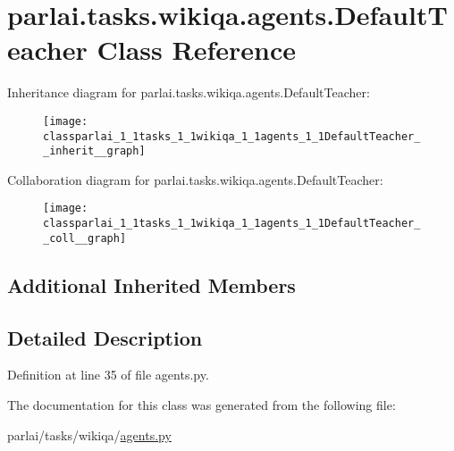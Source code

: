 \hypertarget{classparlai_1_1tasks_1_1wikiqa_1_1agents_1_1DefaultTeacher}{}\section{parlai.\+tasks.\+wikiqa.\+agents.\+Default\+Teacher Class Reference}
\label{classparlai_1_1tasks_1_1wikiqa_1_1agents_1_1DefaultTeacher}


Inheritance diagram for parlai.\+tasks.\+wikiqa.\+agents.\+Default\+Teacher\+:
\nopagebreak
\begin{figure}[H]
\begin{center}
\leavevmode
\texttt{[image: classparlai\_1\_1tasks\_1\_1wikiqa\_1\_1agents\_1\_1DefaultTeacher\_\_inherit\_\_graph]}
\end{center}
\end{figure}


Collaboration diagram for parlai.\+tasks.\+wikiqa.\+agents.\+Default\+Teacher\+:
\nopagebreak
\begin{figure}[H]
\begin{center}
\leavevmode
\texttt{[image: classparlai\_1\_1tasks\_1\_1wikiqa\_1\_1agents\_1\_1DefaultTeacher\_\_coll\_\_graph]}
\end{center}
\end{figure}
\subsection*{Additional Inherited Members}


\subsection{Detailed Description}


Definition at line 35 of file agents.\+py.



The documentation for this class was generated from the following file\+:\begin{DoxyCompactItemize}
\item 
parlai/tasks/wikiqa/\hyperlink{parlai_2tasks_2wikiqa_2agents_8py}{agents.\+py}\end{DoxyCompactItemize}
